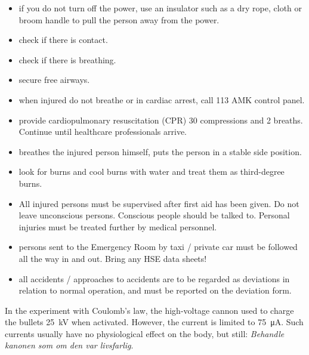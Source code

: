 \documentclass[../Elmag-labhefte-2020.tex]{subfiles}
\begin{document}
\begin{enumerate}
\begin{itemize}
        \item if you do not turn off the power, use an insulator such as a dry rope, cloth or broom handle to pull the person away from the power.
        \item check if there is contact.
        \item check if there is breathing.
        \item secure free airways.
        \item when injured do not breathe or in cardiac arrest, call 113 AMK control panel.
        \item provide cardiopulmonary resuscitation (CPR) 30 compressions and 2 breaths. Continue until healthcare professionals arrive.
        \item breathes the injured person himself, puts the person in a stable side position.
        \item look for burns and cool burns with water and treat them as third-degree burns.
        \item All injured persons must be supervised after first aid has been given. Do not leave unconscious persons. Conscious people should be talked to. Personal injuries must be treated further by medical personnel.
        \item persons sent to the Emergency Room by taxi / private car must be followed all the way in and out. Bring any HSE data sheets!
        \item all accidents / approaches to accidents are to be regarded as deviations in relation to normal operation, and must be reported on the deviation form.
    \end{itemize}
\end{enumerate}

In the experiment with Coulomb's law, the high-voltage cannon used to charge the bullets \SI{25}{\kilo\V} when activated. However, the current is limited to \SI{75}{\micro\ampere}. Such currents usually have no physiological effect on the body, but still: \textit{Behandle kanonen som om den var livsfarlig}.
\end{document}
